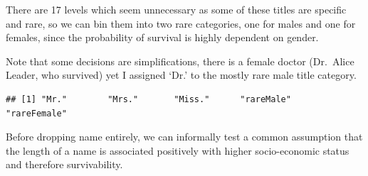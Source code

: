 \documentclass[]{article}
\newenvironment{Shaded}{\begin{snugshade}}{\end{snugshade}}
\newcommand{\KeywordTok}[1]{\textcolor[rgb]{0.13,0.29,0.53}{\textbf{#1}}}
\newcommand{\DecValTok}[1]{\textcolor[rgb]{0.00,0.00,0.81}{#1}}
\newcommand{\StringTok}[1]{\textcolor[rgb]{0.31,0.60,0.02}{#1}}
\newcommand{\CommentTok}[1]{\textcolor[rgb]{0.56,0.35,0.01}{\textit{#1}}}
\newcommand{\ControlFlowTok}[1]{\textcolor[rgb]{0.13,0.29,0.53}{\textbf{#1}}}
\newcommand{\OperatorTok}[1]{\textcolor[rgb]{0.81,0.36,0.00}{\textbf{#1}}}
\newcommand{\NormalTok}[1]{#1}
\begin{document}
There are 17 levels which seem unnecessary as some of these titles are
specific and rare, so we can bin them into two rare categories, one for
males and one for females, since the probability of survival is highly
dependent on gender.

Note that some decisions are simplifications, there is a female doctor
(Dr.~Alice Leader, who survived) yet I assigned `Dr.' to the mostly rare
male title category.

\begin{Shaded}
\end{Shaded}

\begin{verbatim}
## [1] "Mr."        "Mrs."       "Miss."      "rareMale"   "rareFemale"
\end{verbatim}

Before dropping name entirely, we can informally test a common
assumption that the length of a name is associated positively with
higher socio-economic status and therefore survivability.
\end{document}
